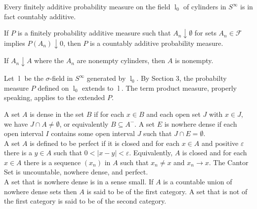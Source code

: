 \documentclass[11pt]{article}
\newcommand{\F}{\mathcal{F}}
\newcommand{\lc}{\mathop l}
\newcommand{\seq}{\subseteq}
\newcommand{\e}{\varepsilon}
\newcommand{\es}{\emptyset}
\newcommand{\ic}{\cap}
\newcommand{\abs}[1]{\left\lvert#1\right\rvert}
\newenvironment{theorem}[2][Theorem]{\begin{trivlist}
\item[\hskip \labelsep {\bfseries #1}\hskip \labelsep {\bfseries #2.}]}{\end{trivlist}}
\newenvironment{definition}[2][Definition]{\begin{trivlist}
\item[\hskip \labelsep {\bfseries #1}\hskip \labelsep {\bfseries #2.}]}{\end{trivlist}}
\newenvironment{rmrk}[2][Remark]{\begin{trivlist}
\item[\hskip \labelsep {\bfseries #1}\hskip \labelsep {\bfseries #2.}]}{\end{trivlist}}
\newenvironment{lemma}[2][Lemma]{\begin{trivlist}
\item[\hskip \labelsep {\bfseries #1}\hskip \labelsep {\bfseries #2.}]}{\end{trivlist}}
\begin{document}
\begin{theorem}{2.3}
    Every finitely additive probability measure on the field $\lc_0$ of cylinders in $S^{\infty}$ is in fact countably additive.
\end{theorem}

\begin{lemma}{18}
    If $P$ is a finitely probability additive measure such that $A_n \downarrow \es$ for sets $A_n \in \F$ implies $P(A_n) \downarrow 0$, then $P$ is a countably additive probability measure.
\end{lemma}

\begin{lemma}{19}
    If $A_n \downarrow A$ where the $A_n$ are nonempty cylinders, then $A$ is nonempty.
\end{lemma}

\begin{rmrk}{20}
    Let $\lc$ be the $\sigma$-field in $S^{\infty}$ generated by $\lc_0$. By Section 3, the probabilty measure $P$ defined on $\lc_0$ extends to $\lc$. The term product measure, properly speaking, applies to the extended $P$.
\end{rmrk}

\begin{definition}{A.15}
    A set $A$ is dense in the set $B$ if for each $x \in B$ and each open set $J$ with $x \in J$, we have $J \ic A \neq \es$, or equivalently $B \seq A^{-}$. A set $E$ is nowhere dense if each open interval $I$ contains some open interval $J$ such that $J \ic E = \es$. \\
    A set $A$ is defined to be perfect if it is closed and for each $x \in A$ and positive $\e$ there is a $y \in A$ such that $0 < \abs{x-y} < \e$. Equivalently, $A$ is closed and for each $x \in A$ there is a sequence $(x_n)$ in $A$ such that $x_n \neq x$ and $x_n \rightarrow x$. The Cantor Set is uncountable, nowhere dense, and perfect. \\
    A set that is nowhere dense is in a sense small. If $A$ is a countable union of nowhere dense sets then $A$ is said to be of the first category. A set that is not of the first category is said to be of the second category.
\end{definition}


\hrulefill
\end{document}
